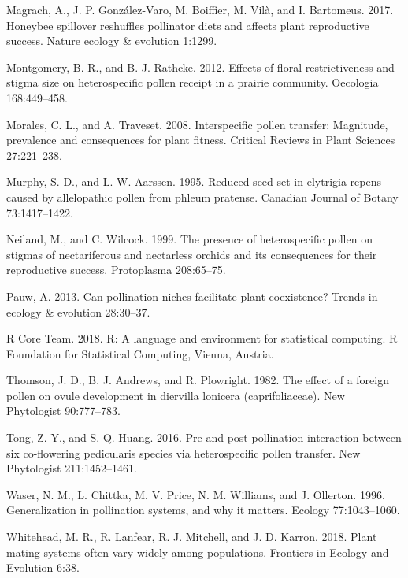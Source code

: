 \documentclass[11pt,a4paper]{article}
\begin{document}
\hypertarget{ref-magrach2017}{}
Magrach, A., J. P. González-Varo, M. Boiffier, M. Vilà, and I.
Bartomeus. 2017. Honeybee spillover reshuffles pollinator diets and
affects plant reproductive success. Nature ecology \& evolution 1:1299.

\hypertarget{ref-montgomery2012}{}
Montgomery, B. R., and B. J. Rathcke. 2012. Effects of floral
restrictiveness and stigma size on heterospecific pollen receipt in a
prairie community. Oecologia 168:449--458.

\hypertarget{ref-morales2008}{}
Morales, C. L., and A. Traveset. 2008. Interspecific pollen transfer:
Magnitude, prevalence and consequences for plant fitness. Critical
Reviews in Plant Sciences 27:221--238.

\hypertarget{ref-murphy1995}{}
Murphy, S. D., and L. W. Aarssen. 1995. Reduced seed set in elytrigia
repens caused by allelopathic pollen from phleum pratense. Canadian
Journal of Botany 73:1417--1422.

\hypertarget{ref-neiland1999}{}
Neiland, M., and C. Wilcock. 1999. The presence of heterospecific pollen
on stigmas of nectariferous and nectarless orchids and its consequences
for their reproductive success. Protoplasma 208:65--75.

\hypertarget{ref-pauw2013}{}
Pauw, A. 2013. Can pollination niches facilitate plant coexistence?
Trends in ecology \& evolution 28:30--37.

\hypertarget{ref-R_Core_Team_2018}{}
R Core Team. 2018. R: A language and environment for statistical
computing. R Foundation for Statistical Computing, Vienna, Austria.

\hypertarget{ref-thomson1982}{}
Thomson, J. D., B. J. Andrews, and R. Plowright. 1982. The effect of a
foreign pollen on ovule development in diervilla lonicera
(caprifoliaceae). New Phytologist 90:777--783.

\hypertarget{ref-tong2016}{}
Tong, Z.-Y., and S.-Q. Huang. 2016. Pre-and post-pollination interaction
between six co-flowering pedicularis species via heterospecific pollen
transfer. New Phytologist 211:1452--1461.

\hypertarget{ref-waser1996}{}
Waser, N. M., L. Chittka, M. V. Price, N. M. Williams, and J. Ollerton.
1996. Generalization in pollination systems, and why it matters. Ecology
77:1043--1060.

\hypertarget{ref-whitehead2018}{}
Whitehead, M. R., R. Lanfear, R. J. Mitchell, and J. D. Karron. 2018.
Plant mating systems often vary widely among populations. Frontiers in
Ecology and Evolution 6:38.
\end{document}

